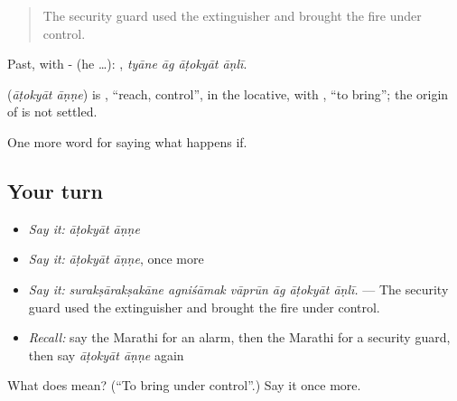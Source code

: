 \begin{quote}
The security guard used the extinguisher and brought the fire under control.
\end{quote}

Past, with - (he …):    , \emph{tyāne āg āṭokyāt āṇlī}.

\begin{cousinweb}
\textbf{ } (\emph{āṭokyāt āṇṇe}) is , \textquotedblleft{}reach, control\textquotedblright{}, in the locative, with , \textquotedblleft{}to bring\textquotedblright{}; the origin of  is not settled.
\end{cousinweb}

\begin{grammarlens}[title={What you've built}]
One more word for saying what happens if.
\end{grammarlens}

\subsection*{Your turn}
\begin{itemize}
\raggedright
  \item \emph{Say it:} \emph{āṭokyāt āṇṇe}
  \item \emph{Say it:} \emph{āṭokyāt āṇṇe}, once more
  \item \emph{Say it:} \emph{surakṣārakṣakāne agniśāmak vāprūn āg āṭokyāt āṇlī.} — The security guard used the extinguisher and brought the fire under control.
  \item \emph{Recall:} say the Marathi for an alarm, then the Marathi for a security guard, then say \emph{āṭokyāt āṇṇe} again
\end{itemize}

\begin{tcolorbox}[breakable,colback=teal!4,colframe=teal!35!black,title={Before you move on}]
What does   mean? (\textquotedblleft{}To bring under control\textquotedblright{}.) Say it once more.
\end{tcolorbox}
